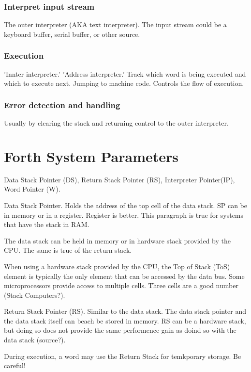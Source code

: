 \subsubsection{Interpret input stream}
The outer interpreter (AKA text interpreter). The input stream could be a 
keyboard buffer, serial buffer, or other source.

\subsubsection{Execution}
'Innter interpreter.' 'Address interpreter.' Track which word is being executed
and which to execute next. Jumping to machine code. Controls the flow of 
execution.

\subsubsection{Error detection and handling}
Usually by clearing the stack and returning control to the outer interpreter.

%
\section{Forth System Parameters}
Data Stack Pointer (DS), Return Stack Pointer (RS), Interpreter Pointer(IP),
Word Pointer (W).

Data Stack Pointer. Holds the address of the top cell of the data stack. SP can be in memory or in a register. Register is better. This paragraph is true for systems that have the stack in RAM.

The data stack can be held in memory or in hardware stack provided by the CPU. The same is true of the return stack.

When using a hardware stack provided by the CPU, the Top of Stack (ToS) element is typically the only element that can be accessed by the data bus. Some microprocessors provide access to multiple cells. Three cells are a good number (Stack Computers?).

Return Stack Pointer (RS). Similar to the data stack. The data stack pointer and the data stack itself can beach be stored in memory. RS can be a hardware stack, but doing so does not provide the same performence gain as doind so with the data stack (source?).

During execution, a word may use the Return Stack for temkporary storage. Be careful!


